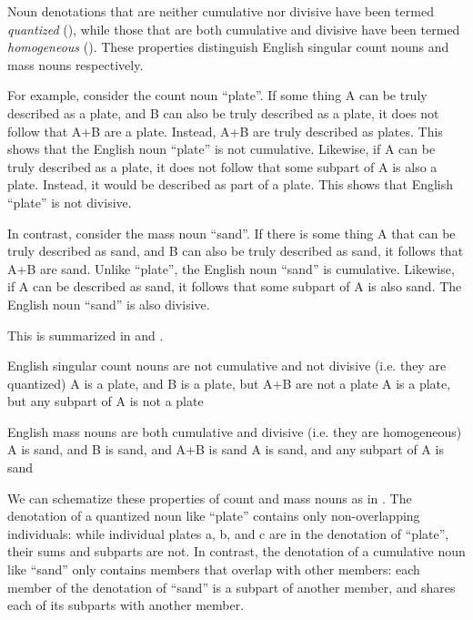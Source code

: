 \documentclass[output=paper,colorlinks,citecolor=brown]{langscibook}
\begin{document}
Noun denotations that are neither cumulative nor divisive have been termed \textit{quantized} (\citealt{Krifka1989, Deal2017}), while those that are both cumulative and divisive have been termed \textit{homogeneous} (\citealt{Bunt1985, Deal2017}). These properties distinguish English singular count nouns and mass nouns respectively.

For example, consider the count noun ``plate''. If some thing A can be truly described as a plate, and B can also be truly described as a plate, it does not follow that A+B are a plate. Instead, A+B are truly described as plates. This shows that the English noun ``plate'' is not cumulative. Likewise, if A can be truly described as a plate, it does not follow that some subpart of A is also a plate. Instead, it would be described as part of a plate. This shows that English ``plate'' is not divisive.

In contrast, consider the mass noun ``sand''. If there is some thing A that can be truly described as sand, and B can also be truly described as sand, it follows that A+B are sand. Unlike ``plate'', the English noun ``sand'' is cumulative. Likewise, if A can be described as sand, it follows that some subpart of A is also sand. The English noun ``sand'' is also divisive.

This is summarized in  and .

\ea%
    \label{ex:sande:15}
    English singular count nouns are not cumulative and not divisive (i.e. they are quantized)
    \ea%
    \label{ex:sande:15a}
    A is a plate, and B is a plate, but A+B are not a plate
    \ex%
    \label{ex:sande:15b}
    A is a plate, but any subpart of A is not a plate
    \z
\z

\ea%
    \label{ex:sande:16}
    English mass nouns are both cumulative and divisive (i.e. they are homogeneous)
    \ea%
    \label{ex:sande:16a}
    A is sand, and B is sand, and A+B is sand
    \ex%
    \label{ex:sande:16b}
    A is sand, and any subpart of A is sand
    \z
\z

We can schematize these properties of count and mass nouns as in . The denotation of a quantized noun like ``plate'' contains only non-overlapping individuals: while individual plates a, b, and c are in the denotation of ``plate'', their sums and subparts are not. In contrast, the denotation of a cumulative noun like ``sand'' only contains members that overlap with other members: each member of the denotation of ``sand'' is a subpart of another member, and shares each of its subparts with another member.
\end{document}
